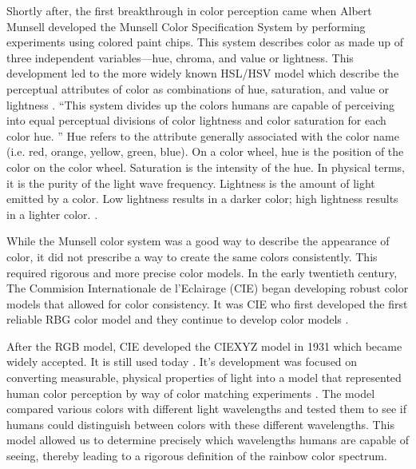 \documentclass[journal,12pt]{IEEEtran}
\begin{document}
Shortly after, the first breakthrough in color perception came when
Albert Munsell developed the Munsell Color Specification System
by performing experiments using colored paint chips.
This system describes color as made up of three independent variables---hue, chroma, and value or lightness.
This development led to the more
widely known HSL/HSV model which describe the perceptual attributes of color as combinations of hue,
saturation, and value or lightness \cite{colormapping,colorimetry}.
``This system
divides up the colors humans are capable of perceiving
into equal perceptual divisions of color lightness and
color saturation for each color hue. \cite{colormapping}''
Hue refers to the attribute generally associated with the color name (i.e. red,
orange, yellow, green, blue). On a color wheel, hue is the position of the color
on the color wheel. Saturation is the intensity of the hue. In
physical terms, it is the purity of the light wave frequency. Lightness is the
amount of light emitted by a color. Low lightness results in a darker color;
high lightness results in a lighter color. \cite{colorguidelines}.


While the Munsell color system was a good way to describe the appearance of color, it did
not prescribe a way to create the same colors consistently.
This required rigorous and more precise color models. In the early twentieth century,
The Commision Internationale de l'Eclairage (CIE) began developing robust color models
that allowed for color consistency. It was CIE who first developed the first reliable
RBG color model and they continue to develop color models \cite{colorimetry}.

After the RGB model, CIE developed the CIEXYZ model in 1931
which became widely accepted. It is still used today \cite{viridis}. It's development was 
focused on converting measurable, physical properties of light into a model
that represented human color perception by way of color matching experiments 
\cite{colorimetry}. The model compared various colors with different light wavelengths
and tested them to see if humans could distinguish between colors with these different
wavelengths. This model allowed us to determine precisely which wavelengths humans 
are capable of seeing, thereby leading to a rigorous definition of the rainbow color
spectrum.
\end{document}
